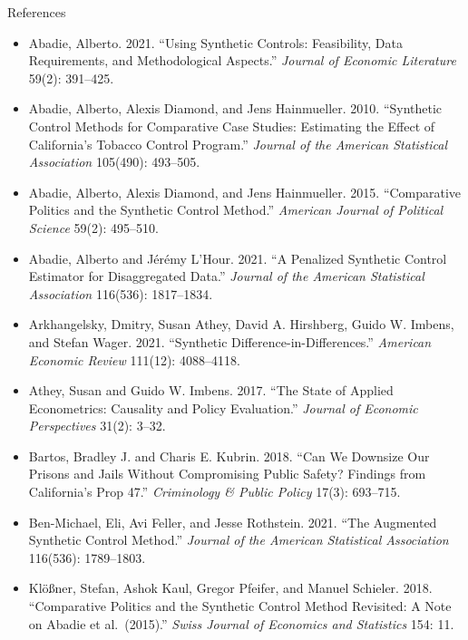 \documentclass[aspectratio=169,11pt,xcolor=dvipsnames]{beamer}
\begin{document}
\begin{frame}[allowframebreaks,t]{References}
\footnotesize
\begin{itemize}\itemsep2pt
\item Abadie, Alberto. 2021. ``Using Synthetic Controls: Feasibility, Data Requirements, and Methodological Aspects.'' \textit{Journal of Economic Literature} 59(2): 391--425.
\item Abadie, Alberto, Alexis Diamond, and Jens Hainmueller. 2010. ``Synthetic Control Methods for Comparative Case Studies: Estimating the Effect of California's Tobacco Control Program.'' \textit{Journal of the American Statistical Association} 105(490): 493--505.
\item Abadie, Alberto, Alexis Diamond, and Jens Hainmueller. 2015. ``Comparative Politics and the Synthetic Control Method.'' \textit{American Journal of Political Science} 59(2): 495--510.
\item Abadie, Alberto and Jérémy L'Hour. 2021. ``A Penalized Synthetic Control Estimator for Disaggregated Data.'' \textit{Journal of the American Statistical Association} 116(536): 1817--1834.
\item Arkhangelsky, Dmitry, Susan Athey, David A. Hirshberg, Guido W. Imbens, and Stefan Wager. 2021. ``Synthetic Difference-in-Differences.'' \textit{American Economic Review} 111(12): 4088--4118.
\item Athey, Susan and Guido W. Imbens. 2017. ``The State of Applied Econometrics: Causality and Policy Evaluation.'' \textit{Journal of Economic Perspectives} 31(2): 3--32.
\item Bartos, Bradley J. and Charis E. Kubrin. 2018. ``Can We Downsize Our Prisons and Jails Without Compromising Public Safety? Findings from California's Prop 47.'' \textit{Criminology \& Public Policy} 17(3): 693--715.
\item Ben-Michael, Eli, Avi Feller, and Jesse Rothstein. 2021. ``The Augmented Synthetic Control Method.'' \textit{Journal of the American Statistical Association} 116(536): 1789--1803.
\item Klößner, Stefan, Ashok Kaul, Gregor Pfeifer, and Manuel Schieler. 2018. ``Comparative Politics and the Synthetic Control Method Revisited: A Note on Abadie et al.\ (2015).'' \textit{Swiss Journal of Economics and Statistics} 154: 11.
\end{itemize}
\end{frame}
\end{document}
